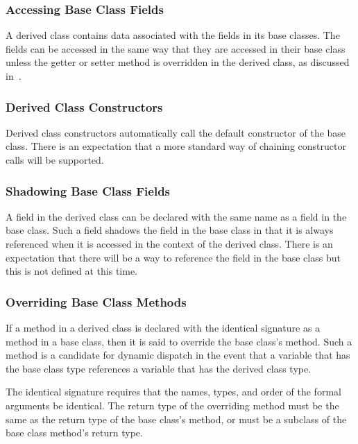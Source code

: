 \subsubsection{Accessing Base Class Fields}
\label{Accessing_Base_Class_Fields}

A derived class contains data associated with the fields in its base
classes.  The fields can be accessed in the same way that they are
accessed in their base class unless the getter or setter method is
overridden in the derived class, as discussed
in~.

\subsubsection{Derived Class Constructors}
\label{Derived_Class_Constructors}

Derived class constructors automatically call the default constructor
of the base class.  There is an expectation that a more standard way
of chaining constructor calls will be supported.

\subsubsection{Shadowing Base Class Fields}
\label{Shadowing_Base_Class_Fields}

A field in the derived class can be declared with the same name as a
field in the base class.  Such a field shadows the field in the base
class in that it is always referenced when it is accessed in the
context of the derived class.  There is an expectation that there will
be a way to reference the field in the base class but this is not
defined at this time.

\subsubsection{Overriding Base Class Methods}
\label{Overriding_Base_Class_Methods}

If a method in a derived class is declared with the identical
signature as a method in a base class, then it is said to override the
base class's method.  Such a method is a candidate for dynamic
dispatch in the event that a variable that has the base class type
references a variable that has the derived class type.

The identical signature requires that the names, types, and order of
the formal arguments be identical. The return type of the overriding
method must be the same as the return type of the base class's method,
or must be a subclass of the base class method's return type.

